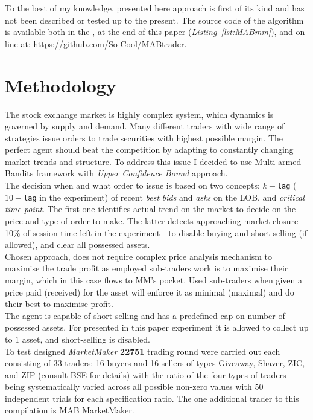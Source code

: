 \documentclass{llncs}
\begin{document}
To the best of my knowledge, presented here approach is first of its kind and has not been described or tested up to the present. The source code of the algorithm is available both in the \emph{\appendixname}, at the end of this paper (\emph{Listing~\ref{lst:MABmm}}), and on-line at: \url{https://github.com/So-Cool/MABtrader}.\\

\section{Methodology}
The stock exchange market is highly complex system, which dynamics is governed by supply and demand. Many different traders with wide range of strategies issue orders to trade securities with highest possible margin. The perfect agent should beat the competition by adapting to constantly changing market trends and structure. To address this issue I decided to use Multi-armed Bandits framework with \emph{Upper Confidence Bound} approach.\\

The decision when and what order to issue is based on two concepts: $k-$\texttt{lag} ($10-$\texttt{lag} in the experiment) of recent \emph{best} \emph{bids} and \emph{asks} on the LOB, and \emph{critical time point}. The first one identifies actual trend on the market to decide on the price and type of order to make. The latter detects approaching market closure---10\% of session time left in the experiment---to disable buying and short-selling (if allowed), and clear all possessed assets.\\
Chosen approach, does not require complex price analysis mechanism to maximise the trade profit as employed sub-traders work is to maximise their margin, which in this case flows to MM's pocket. Used sub-traders when given a price paid (received) for the asset will enforce it as minimal (maximal) and do their best to maximise profit.\\
The agent is capable of short-selling and has a predefined cap on number of possessed assets. For presented in this paper experiment it is allowed to collect up to $1$ asset, and short-selling is disabled.\\

To test designed \emph{MarketMaker} \textbf{22751} trading round were carried out each consisting of 33 traders: 16 buyers and 16 sellers of types Giveaway, Shaver, ZIC, and ZIP (consult BSE for details) with the ratio of the four types of traders being systematically varied across all possible non-zero values with 50 independent trials for each specification ratio. The one additional trader to this compilation is MAB MarketMaker.
\end{document}
